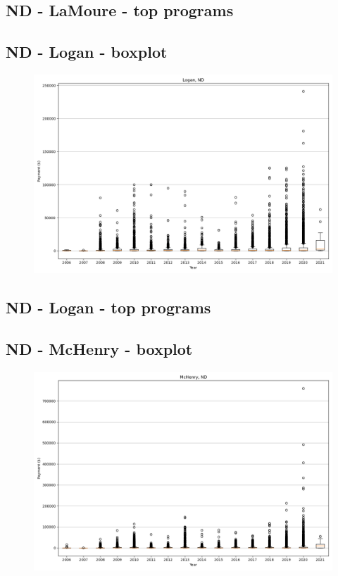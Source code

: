 \subsection*{ND - LaMoure - top programs}

\newpage
\subsection*{ND - Logan - boxplot}
\begin{figure}[h]
\centering
\includegraphics[width=7in]{../output/boxplots/counties/Logan-ND_boxplot.png}
\end{figure}


\subsection*{ND - Logan - top programs}

\newpage
\subsection*{ND - McHenry - boxplot}
\begin{figure}[h]
\centering
\includegraphics[width=7in]{../output/boxplots/counties/McHenry-ND_boxplot.png}
\end{figure}


